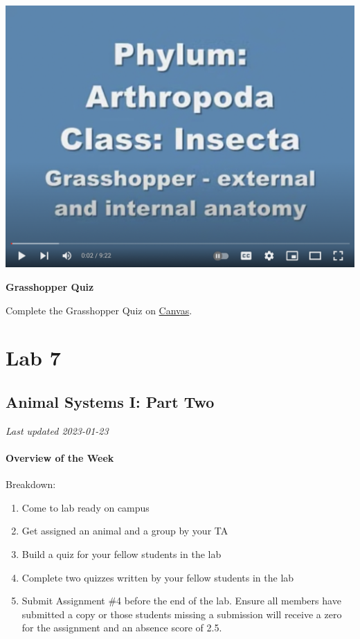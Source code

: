 \documentclass[
]{book}
\providecommand{\tightlist}{%
  \setlength{\itemsep}{0pt}\setlength{\parskip}{0pt}}
\begin{document}
\includegraphics{images/Lab6_Grasshopper_Dissection_Video1.png}

\textbf{Grasshopper Quiz}

Complete the Grasshopper Quiz on \href{https://canvas.ubc.ca/}{Canvas}.

\hypertarget{part-lab-7}{%
\part*{Lab 7}\label{part-lab-7}}

\hypertarget{animal-systems-i-part-two}{%
\chapter*{Animal Systems I: Part Two}\label{animal-systems-i-part-two}}

\emph{Last updated 2023-01-23}

\hypertarget{overview-of-the-week-1}{%
\subsection*{Overview of the Week}\label{overview-of-the-week-1}}

Breakdown:

\begin{enumerate}
\def\labelenumi{\arabic{enumi}.}
\tightlist
\item
  Come to lab ready on campus
\item
  Get assigned an animal and a group by your TA
\item
  Build a quiz for your fellow students in the lab
\item
  Complete two quizzes written by your fellow students in the lab
\item
  Submit Assignment \#4 before the end of the lab. Ensure all members have submitted a copy or those students missing a submission will receive a zero for the assignment and an absence score of 2.5.
\end{enumerate}
\end{document}
